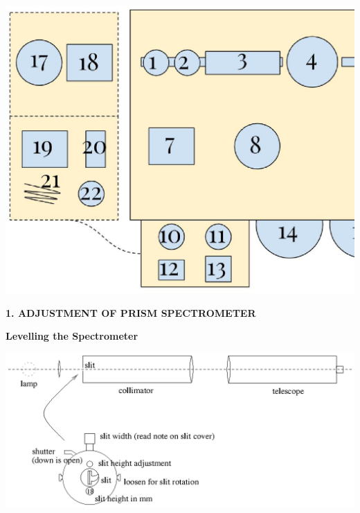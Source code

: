 \documentclass[12pt]{article}
\begin{document}
\begin{center}
\includegraphics[width=\textwidth]{ap3labbench.ps}
\end{center}

\newpage

{\bf 1. ADJUSTMENT OF PRISM SPECTROMETER}

{\bf Levelling the Spectrometer}

\begin{center}
\includegraphics{ap3labspec0.ps}
\end{center}
\end{document}
